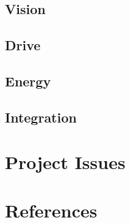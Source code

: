\documentclass[11pt, a4paper]{article}
\begin{document}
\subsection{Vision}




\subsection{Drive}




\subsection{Energy}




\subsection{Integration}




\pagebreak
\section{Project Issues}




\pagebreak
\section{References}
\end{document}
